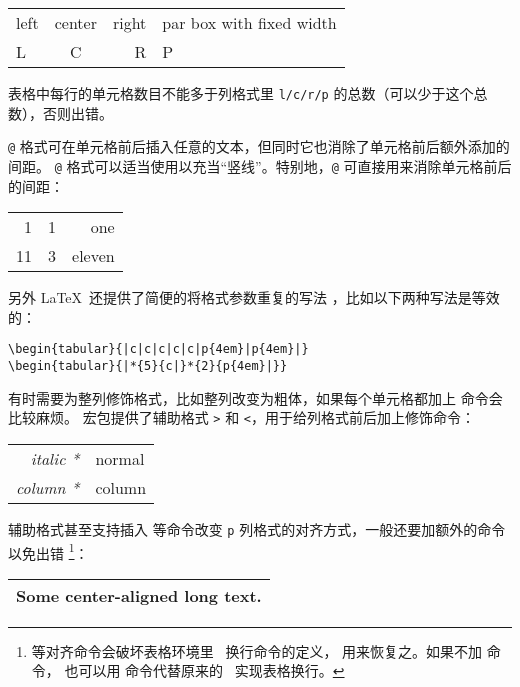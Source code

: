 \begin{example}
\begin{tabular}{lcr|p{6em}}
  \hline
  left & center & right 
       & par box with fixed width\\
  L    & C      & R     & P \\
 \hline
\end{tabular}
\end{example}

表格中每行的单元格数目不能多于列格式里 \texttt{l/c/r/p} 的总数（可以少于这个总数），否则出错。

\texttt{@} 格式可在单元格前后插入任意的文本，但同时它也消除了单元格前后额外添加的间距。
\texttt{@} 格式可以适当使用以充当“竖线”。特别地，\texttt{@}\marg*{} 可直接用来消除单元格前后的间距：
\begin{example}
\begin{tabular}{@{} r@{:}lr @{}}
  \hline
  1  & 1 & one \\
  11 & 3 & eleven \\
  \hline
\end{tabular}
\end{example}

另外 \LaTeX\ 还提供了简便的将格式参数重复的写法 \texttt*{}，比如以下两种写法是等效的：
\begin{verbatim}
\begin{tabular}{|c|c|c|c|c|p{4em}|p{4em}|}
\begin{tabular}{|*{5}{c|}*{2}{p{4em}|}}
\end{verbatim}

有时需要为整列修饰格式，比如整列改变为粗体，如果每个单元格都加上  命令会比较麻烦。
 宏包提供了辅助格式 \texttt> 和 \texttt<，用于给列格式前后加上修饰命令：
\begin{example}
\begin{tabular}{>{\itshape}r<{*}l}
  \hline
  italic & normal \\
  column & column \\
  \hline
\end{tabular}
\end{example}

辅助格式甚至支持插入  等命令改变 \texttt{p} 列格式的对齐方式，一般还要加额外的命令 以免出错%
\footnote{ 等对齐命令会破坏表格环境里 \crcmd\ 换行命令的定义，
 用来恢复之。如果不加  命令，
也可以用  命令代替原来的 \crcmd\ 实现表格换行。}：
\begin{example}
\begin{tabular}
{>{\centering\arraybackslash}p{9em}}
  \hline
  Some center-aligned long text. \\ 
  \hline
\end{tabular}
\end{example}

